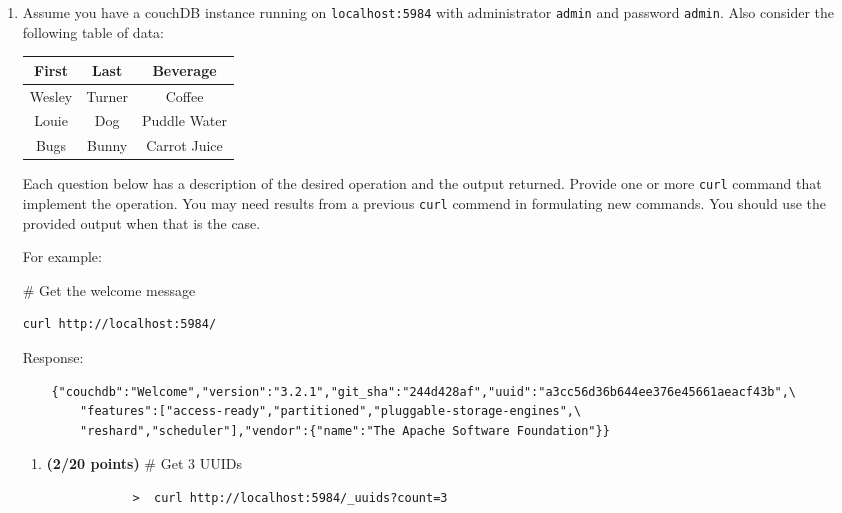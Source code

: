 \documentclass[10pt]{article}
\begin{document}
\begin{enumerate}
\newpage

    \item Assume you have a couchDB instance running on \verb*|localhost:5984| with administrator \verb*|admin| and password \verb*|admin|. Also consider the following table of data:
    
    \begin{center}
    	
    	\begin{tabular}{|c|c|c|} \hline
    	\textbf{First} & \textbf{Last} & \textbf{Beverage}  \\ \hline
    	Wesley & Turner & Coffee  \\ \hline 
    	Louie & Dog & Puddle Water  \\ \hline 
    	Bugs & Bunny & Carrot Juice  \\ \hline 
    	\end{tabular}
    
    \end{center}
    
    Each question below has a description of the desired operation and the output returned. Provide one or more \verb*|curl| command that implement the operation. You may need results from a previous \verb*|curl| commend
    in formulating new commands. You should use the provided output when that is the case.
    
    For example:
    
    \# Get the welcome message
\begin{lstlisting}
curl http://localhost:5984/
\end{lstlisting}
        Response:
	\begin{lstlisting}
	{"couchdb":"Welcome","version":"3.2.1","git_sha":"244d428af","uuid":"a3cc56d36b644ee376e45661aeacf43b",\
		"features":["access-ready","partitioned","pluggable-storage-engines",\
		"reshard","scheduler"],"vendor":{"name":"The Apache Software Foundation"}}
    \end{lstlisting}
 
\begin{enumerate}
	
	\item \textbf{(2/20 points)} \# Get 3 UUIDs 
	
		\beginanswers	
		
			\begin{lstlisting}
			>  curl http://localhost:5984/_uuids?count=3
			\end{lstlisting}
		
		\else


\end{enumerate}
\end{enumerate}
\end{document}
